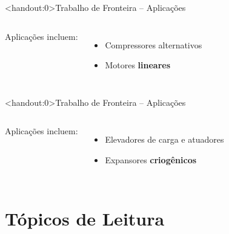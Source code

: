     \begin{frame}<handout:0>{Trabalho de Fronteira -- Aplicações}\vspace*{-2em}
        \begin{columns}
        Aplicações incluem: \\[\medskipamount]
        \begin{itemize}
            \item Compressores alternativos
            \item Motores \textbf{\alert{lineares}}
        \end{itemize}
        \end{columns}
    \end{frame}

    \begin{frame}<handout:0>{Trabalho de Fronteira -- Aplicações}\vspace*{-2em}
        \begin{columns}
        Aplicações incluem: \\[\medskipamount]
        \begin{itemize}
            \item Elevadores de carga e atuadores
            \item Expansores \textbf{\alert{criogênicos}}
        \end{itemize}
        \end{columns}
    \end{frame}

\section{Tópicos de Leitura}

